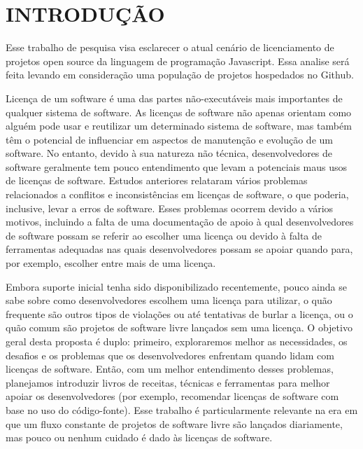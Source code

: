 
\chapter{INTRODUÇÃO}
\label{chap:introducao}

Esse trabalho de pesquisa visa esclarecer o atual cenário de licenciamento de projetos open source da linguagem de programação Javascript. Essa analise será feita levando em consideração uma população de projetos hospedados no Github.

Licença de um software é uma das partes não-executáveis mais importantes de qualquer sistema de software. As licenças de software não apenas orientam como alguém pode usar e reutilizar um determinado sistema de software, mas também têm o potencial de influenciar em aspectos de manutenção e evolução de um software. No entanto, devido à sua natureza não técnica, desenvolvedores de software geralmente tem pouco entendimento que levam a potenciais maus usos de licenças de software. Estudos anteriores relataram vários problemas relacionados a conflitos e inconsistências em licenças de software, o que poderia, inclusive, levar a erros de software. Esses problemas ocorrem devido a vários motivos, incluindo a falta de uma documentação de apoio à qual desenvolvedores de software possam se referir ao escolher uma licença ou devido à falta de ferramentas adequadas nas quais desenvolvedores possam se apoiar quando para, por exemplo, escolher entre mais de uma licença. 

Embora suporte inicial tenha sido disponibilizado recentemente, pouco ainda se sabe sobre \cite{Almeida:2017:SDU:3101414.3101416} como desenvolvedores escolhem uma licença para utilizar, \cite{Bodden:2018:SSA:3183399.3183401} o quão frequente são outros tipos de violações ou até tentativas de burlar a licença, ou \cite{Cartaxo:2016:EBT:2961111.2962603} o quão comum são projetos de software livre lançados sem uma licença. O objetivo geral desta proposta é duplo: primeiro, exploraremos melhor as necessidades, os desafios e os problemas que os desenvolvedores enfrentam quando lidam com licenças de software. Então, com um melhor entendimento desses problemas, planejamos introduzir livros de receitas, técnicas e ferramentas para melhor apoiar os desenvolvedores (por exemplo, recomendar licenças de software com base no uso do código-fonte). Esse trabalho é particularmente relevante na era em que um fluxo constante de projetos de software livre são lançados diariamente, mas pouco ou nenhum cuidado é dado às licenças de software.

